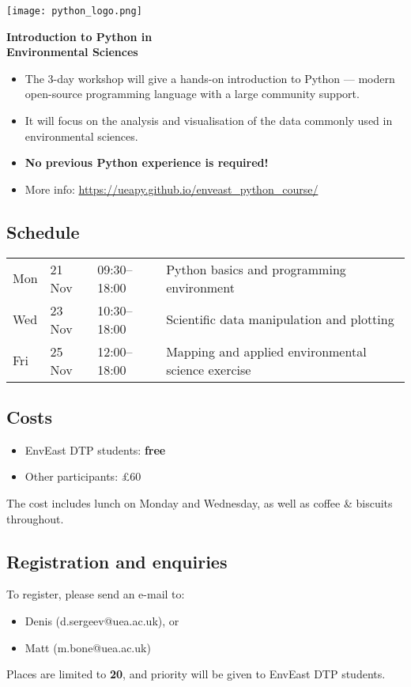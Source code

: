 \documentclass[paper=a4]{scrartcl}
\newcommand*{\pyitem}{\item [{\texttt{[image: python\_logo.png]}}]}
\begin{document}
\pagestyle{empty} %

\begin{center}
\begin{minipage}{0.2\linewidth}
    \texttt{[image: python\_logo.png]}
    \vspace{0.5cm}
\end{minipage}

\Huge \textbf{Introduction to Python in \\ Environmental Sciences}

\end{center}

\begin{itemize}
\pyitem The 3-day workshop will give a hands-on introduction to Python --- modern open-source programming language with a large community support.
\pyitem It will focus on the analysis and visualisation of the data commonly used in environmental sciences.
\pyitem \textbf{No previous Python experience is required!}
\pyitem More info: \url{https://ueapy.github.io/enveast_python_course/}
\end{itemize}


\subsection*{Schedule}
\begin{center}
\begin{tabular}{llll}
Mon & 21 Nov & 09:30--18:00 & Python basics and programming environment\\
Wed & 23 Nov & 10:30--18:00 & Scientific data manipulation and plotting \\
Fri & 25 Nov & 12:00--18:00 & Mapping and applied environmental science exercise\\
\end{tabular}
\end{center}


\subsection*{Costs}
\begin{itemize}
\pyitem EnvEast DTP students: \textbf{free}
\pyitem Other participants: \pounds 60
\end{itemize}
\vspace{-0.5cm}
\scriptsize The cost includes lunch on Monday and Wednesday, as well as coffee \& biscuits throughout. \normalsize

\subsection*{Registration and enquiries}
To register, please send an e-mail to:
\begin{itemize}
\pyitem Denis (d.sergeev@uea.ac.uk), or
\pyitem Matt (m.bone@uea.ac.uk)
\end{itemize}
Places are limited to \textbf{20}, and priority will be given to EnvEast DTP students.
\end{document}
